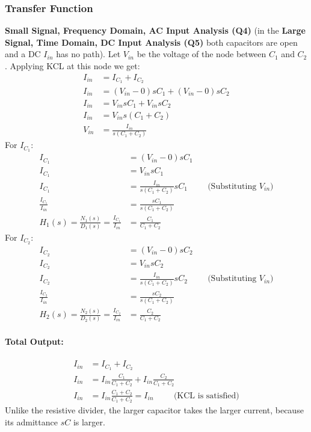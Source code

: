 \subsubsection{Transfer Function}
\textbf{Small Signal, Frequency Domain, AC Input Analysis (Q4)} (in the
\textbf{Large Signal, Time Domain, DC Input Analysis (Q5)} both capacitors
are open and a DC \(I_{in}\) has no path). Let \(V_{in}\) be the voltage of
the node between \(C_1\) and \(C_2\). Applying KCL at this node we get:
\begin{align*}
  I_{in} &= I_{C_1} + I_{C_2} \\
  I_{in} &= (V_{in} - 0)sC_1 + (V_{in} - 0)sC_2 \\
  I_{in} &= V_{in}sC_1 + V_{in}sC_2 \\
  I_{in} &= V_{in}s(C_1 + C_2) \\
  V_{in} &= \frac{I_{in}}{s(C_1 + C_2)}
\end{align*}
For \(I_{C_1}\):
\begin{align*}
  I_{C_1} &= (V_{in} - 0)sC_1 \\
  I_{C_1} &= V_{in}sC_1 \\
  I_{C_1} &= \frac{I_{in}}{s(C_1 + C_2)}sC_1 \hspace{1cm} \text{(Substituting \(V_{in}\))} \\
  \frac{I_{C_1}}{I_{in}} &= \frac{sC_1}{s(C_1 + C_2)} \\
  H_1(s) = \frac{N_1(s)}{D_1(s)} = \frac{I_{C_1}}{I_{in}} &= \frac{C_1}{C_1 + C_2}
\end{align*}
For \(I_{C_2}\):
\begin{align*}
  I_{C_2} &= (V_{in} - 0)sC_2 \\
  I_{C_2} &= V_{in}sC_2 \\
  I_{C_2} &= \frac{I_{in}}{s(C_1 + C_2)}sC_2 \hspace{1cm} \text{(Substituting \(V_{in}\))} \\
  \frac{I_{C_2}}{I_{in}} &= \frac{sC_2}{s(C_1 + C_2)} \\
  H_2(s) = \frac{N_2(s)}{D_2(s)} = \frac{I_{C_2}}{I_{in}} &= \frac{C_2}{C_1 + C_2}
\end{align*}
\paragraph{Total Output:}
\begin{align*}
  I_{in} &= I_{C_1} + I_{C_2} \\
  I_{in} &= I_{in} \frac{C_1}{C_1 + C_2} + I_{in} \frac{C_2}{C_1 + C_2} \\
  I_{in} &= I_{in} \frac{C_1 + C_2}{C_1 + C_2} = I_{in} \hspace{1cm} \text{(KCL is satisfied)}
\end{align*}
Unlike the resistive divider, the larger capacitor takes the larger
current, because its admittance \(sC\) is larger.

